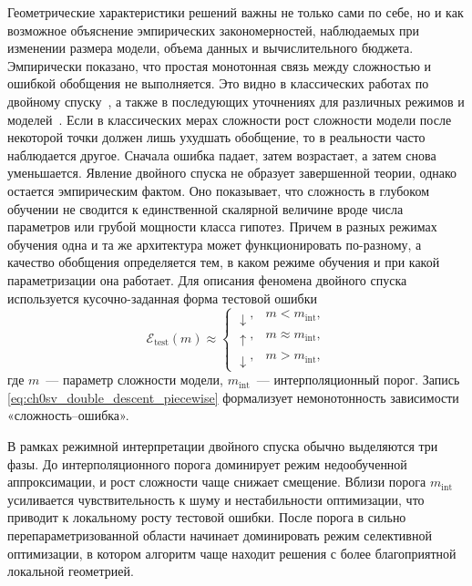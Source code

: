 Геометрические характеристики решений важны не только сами по себе, но и как возможное объяснение эмпирических закономерностей, наблюдаемых при изменении размера модели, объема данных и вычислительного бюджета.
Эмпирически показано, что простая монотонная связь между сложностью и ошибкой обобщения не выполняется. Это видно в классических работах по двойному спуску~\cite{belkin2019reconciling,nakkiran2021doubledescent}, а также в последующих уточнениях для различных режимов и моделей~\cite{shcherbina2024vcdd,song2019randomfeatures,advani2020highdim}.
Если в классических мерах сложности рост сложности модели после некоторой точки должен лишь ухудшать обобщение, то в реальности часто наблюдается другое.
Сначала ошибка падает, затем возрастает, а затем снова уменьшается.
Явление двойного спуска не образует завершенной теории, однако остается эмпирическим фактом.
Оно показывает, что сложность в глубоком обучении не сводится к единственной скалярной величине вроде числа параметров или грубой мощности класса гипотез.
Причем в разных режимах обучения одна и та же архитектура может функционировать по-разному, а качество обобщения определяется тем, в каком режиме обучения и при какой параметризации она работает.
Для описания феномена двойного спуска используется кусочно-заданная форма тестовой ошибки
\begin{equation}
\mathcal E_{\mathrm{test}}(m)\approx
\begin{cases}
\downarrow, & m<m_{\mathrm{int}},\\
\uparrow, & m\approx m_{\mathrm{int}},\\
\downarrow, & m>m_{\mathrm{int}},
\end{cases}
\label{eq:ch0sv_double_descent_piecewise}
\end{equation}
где $m$~--- параметр сложности модели, $m_{\mathrm{int}}$~--- интерполяционный порог. Запись \eqref{eq:ch0sv_double_descent_piecewise} формализует немонотонность зависимости «сложность--ошибка».

В рамках режимной интерпретации двойного спуска обычно выделяются три фазы. До интерполяционного порога доминирует режим недообученной аппроксимации, и рост сложности чаще снижает смещение. Вблизи порога $m_{\mathrm{int}}$ усиливается чувствительность к шуму и нестабильности оптимизации, что приводит к локальному росту тестовой ошибки. После порога в сильно перепараметризованной области начинает доминировать режим селективной оптимизации, в котором алгоритм чаще находит решения с более благоприятной локальной геометрией.

